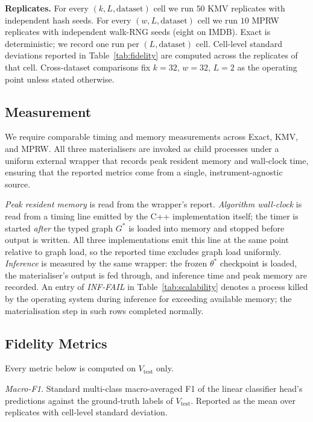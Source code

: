 \documentclass[sigconf]{acmart}
\begin{document}
\noindent\textbf{Replicates.}
For every $(k, L, \text{dataset})$ cell we run $50$ KMV replicates with independent hash seeds. For every $(w, L, \text{dataset})$ cell we run $10$ MPRW replicates with independent walk-RNG seeds (eight on IMDB). Exact is deterministic; we record one run per $(L, \text{dataset})$ cell. Cell-level standard deviations reported in Table~\ref{tab:fidelity} are computed across the replicates of that cell. Cross-dataset comparisons fix $k{=}32$, $w{=}32$, $L{=}2$ as the operating point unless stated otherwise.

\subsection{Measurement}
\label{sec:methodology-measurement}

We require comparable timing and memory measurements across Exact, KMV, and MPRW. All three materialisers are invoked as child processes under a uniform external wrapper that records peak resident memory and wall-clock time, ensuring that the reported metrics come from a single, instrument-agnostic source.

\emph{Peak resident memory} is read from the wrapper's report. \emph{Algorithm wall-clock} is read from a timing line emitted by the C++ implementation itself; the timer is started \emph{after} the typed graph $G^*$ is loaded into memory and stopped before output is written. All three implementations emit this line at the same point relative to graph load, so the reported time excludes graph load uniformly. \emph{Inference} is measured by the same wrapper: the frozen $\theta^*$ checkpoint is loaded, the materialiser's output is fed through, and inference time and peak memory are recorded. An entry of \emph{INF-FAIL} in Table~\ref{tab:scalability} denotes a process killed by the operating system during inference for exceeding available memory; the materialisation step in such rows completed normally.

\subsection{Fidelity Metrics}
\label{sec:methodology-metrics}

Every metric below is computed on $V_\text{test}$ only.

\emph{Macro-F1.} Standard multi-class macro-averaged F1 of the linear classifier head's predictions against the ground-truth labels of $V_\text{test}$. Reported as the mean over replicates with cell-level standard deviation.
\end{document}
